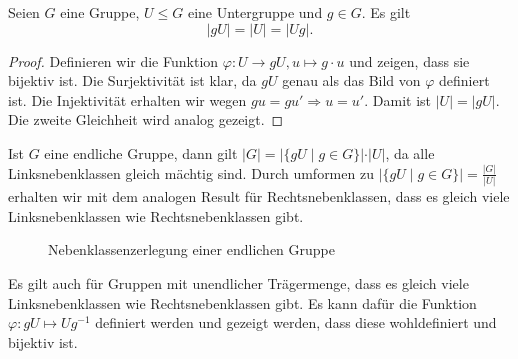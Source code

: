 \begin{lemma}
    Seien $G$ eine Gruppe, $U \le G$ eine Untergruppe und $g \in G$. Es gilt $$\vert gU \vert = \vert U \vert = \vert Ug \vert.$$
\end{lemma}
\begin{proof}
    Definieren wir die Funktion $\varphi: U \to gU, u \mapsto g\cdot u$ und zeigen, dass sie bijektiv ist. Die Surjektivität ist klar, da $gU$ genau als das Bild von $\varphi$ definiert ist. Die Injektivität erhalten wir wegen $gu = gu' \Rightarrow u = u'$. Damit ist $\vert U \vert = \vert gU \vert$. Die zweite Gleichheit wird analog gezeigt.
\end{proof}

\begin{remark}\label{rem:nebenklassenzerlegung_endlich}
    Ist $G$ eine endliche Gruppe, dann gilt $\vert G \vert = \vert \{gU \mid g \in G\} \vert \cdot \vert U \vert$, da alle Linksnebenklassen gleich mächtig sind. Durch umformen zu $\vert \{gU \mid g \in G\} \vert = \frac{\vert G \vert}{\vert U \vert}$  erhalten wir mit dem analogen Result für Rechtsnebenklassen, dass es gleich viele Linksnebenklassen wie Rechtsnebenklassen gibt.

    \begin{figure}[H]
        \centering
        \caption{Nebenklassenzerlegung einer endlichen Gruppe}
    \end{figure}
\end{remark}

\begin{remark}
    Es gilt auch für Gruppen mit unendlicher Trägermenge, dass es gleich viele Linksnebenklassen wie Rechtsnebenklassen gibt. Es kann dafür die Funktion $\varphi: gU \mapsto Ug^{-1}$ definiert werden und gezeigt werden, dass diese wohldefiniert und bijektiv ist.
\end{remark}

